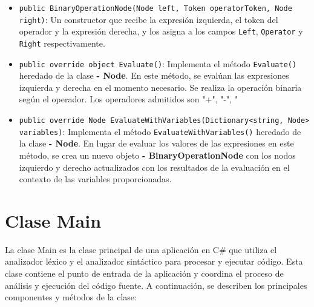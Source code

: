 \documentclass{article}
\newcommand{\subclassed}[1]{\textcolor{classcolor}{\textbf{- #1}}}
\begin{document}
\begin{itemize}
    \item \lstinline{public BinaryOperationNode(Node left, Token operatorToken, Node right)}: Un constructor que recibe la expresión izquierda, el token del operador y la expresión derecha, y los asigna a los campos \lstinline{Left}, \lstinline{Operator} y \lstinline{Right} respectivamente.

    \item \lstinline{public override object Evaluate()}: Implementa el método \lstinline{Evaluate()} heredado de la clase \subclassed{Node}. En este método, se evalúan las expresiones izquierda y derecha en el momento necesario. Se realiza la operación binaria según el operador. Los operadores admitidos son "+", "-", "%

    \item \lstinline{public override Node EvaluateWithVariables(Dictionary<string, Node> variables)}: Implementa el método \lstinline{EvaluateWithVariables()} heredado de la clase \subclassed{Node}. En lugar de evaluar los valores de las expresiones en este método, se crea un nuevo objeto \subclassed{BinaryOperationNode} con los nodos izquierdo y derecho actualizados con los resultados de la evaluación en el contexto de las variables proporcionadas.

\end{itemize}
\section{Clase \textcolor{classcolor}{Main}}
La clase \textcolor{classcolor}{Main} es la clase principal de una aplicación en C\# que utiliza el analizador léxico y el analizador sintáctico para procesar y ejecutar código. Esta clase contiene el punto de entrada de la aplicación y coordina el proceso de análisis y ejecución del código fuente. A continuación, se describen los principales componentes y métodos de la clase:
\end{document}
